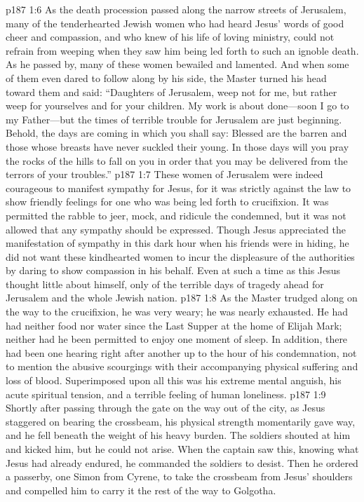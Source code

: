 \pc \vs p187 1:6 As the death procession passed along the narrow streets of Jerusalem, many of the tenderhearted Jewish women who had heard Jesus’ words of good cheer and compassion, and who knew of his life of loving ministry, could not refrain from weeping when they saw him being led forth to such an ignoble death. As he passed by, many of these women bewailed and lamented. And when some of them even dared to follow along by his side, the Master turned his head toward them and said: \textcolor{ubdarkred}{“Daughters of Jerusalem, weep not for me, but rather weep for yourselves and for your children. My work is about done---soon I go to my Father---but the times of terrible trouble for Jerusalem are just beginning. Behold, the days are coming in which you shall say: Blessed are the barren and those whose breasts have never suckled their young. In those days will you pray the rocks of the hills to fall on you in order that you may be delivered from the terrors of your troubles.”}
\vs p187 1:7 These women of Jerusalem were indeed courageous to manifest sympathy for Jesus, for it was strictly against the law to show friendly feelings for one who was being led forth to crucifixion. It was permitted the rabble to jeer, mock, and ridicule the condemned, but it was not allowed that any sympathy should be expressed. Though Jesus appreciated the manifestation of sympathy in this dark hour when his friends were in hiding, he did not want these kindhearted women to incur the displeasure of the authorities by daring to show compassion in his behalf. Even at such a time as this Jesus thought little about himself, only of the terrible days of tragedy ahead for Jerusalem and the whole Jewish nation.
\vs p187 1:8 As the Master trudged along on the way to the crucifixion, he was very weary; he was nearly exhausted. He had had neither food nor water since the Last Supper at the home of Elijah Mark; neither had he been permitted to enjoy one moment of sleep. In addition, there had been one hearing right after another up to the hour of his condemnation, not to mention the abusive scourgings with their accompanying physical suffering and loss of blood. Superimposed upon all this was his extreme mental anguish, his acute spiritual tension, and a terrible feeling of human loneliness.
\vs p187 1:9 Shortly after passing through the gate on the way out of the city, as Jesus staggered on bearing the crossbeam, his physical strength momentarily gave way, and he fell beneath the weight of his heavy burden. The soldiers shouted at him and kicked him, but he could not arise. When the captain saw this, knowing what Jesus had already endured, he commanded the soldiers to desist. Then he ordered a passerby, one Simon from Cyrene, to take the crossbeam from Jesus’ shoulders and compelled him to carry it the rest of the way to Golgotha.
